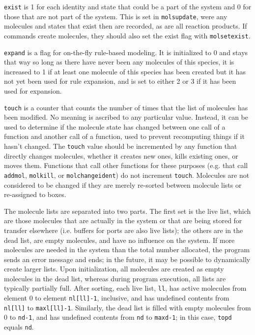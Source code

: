 \documentclass {book}
\begin{document}
\texttt{exist} is 1 for each identity and state that could be a part of the system and 0 for those that are not part of the system.  This is set in \texttt{molsupdate}, were any molecules and states that exist then are recorded, as are all reaction products.  If commands create molecules, they should also set the exist flag with \texttt{molsetexist}.

\texttt{expand} is a flag for on-the-fly rule-based modeling.  It is initialized to 0 and stays that way so long as there have never been any molecules of this species, it is increased to 1 if at least one molecule of this species has been created but it has not yet been used for rule expansion, and is set to either 2 or 3 if it has been used for expansion.

\texttt{touch} is a counter that counts the number of times that the list of molecules has been modified. No meaning is ascribed to any particular value. Instead, it can be used to determine if the molecule state has changed between one call of a function and another call of a function, used to prevent recomputing things if it hasn't changed. The \texttt{touch} value should be incremented by any function that directly changes molecules, whether it creates new ones, kills existing ones, or moves them. Functions that call other functions for these purposes (e.g. that call \texttt{addmol}, \texttt{molkill}, or \texttt{molchangeident}) do not increment \texttt{touch}. Molecules are not considered to be changed if they are merely re-sorted between molecule lists or re-assigned to boxes.

The molecule lists are separated into two parts.  The first set is the live list, which are those molecules that are actually in the system or that are being stored for transfer elsewhere (i.e. buffers for ports are also live lists); the others are in the dead list, are empty molecules, and have no influence on the system.  If more molecules are needed in the system than the total number allocated, the program sends an error message and ends; in the future, it may be possible to dynamically create larger lists.  Upon initialization, all molecules are created as empty molecules in the dead list, whereas during program execution, all lists are typically partially full.  After sorting, each live list, \texttt{ll}, has active molecules from element 0 to element \texttt{nl[ll]-1}, inclusive, and has undefined contents from \texttt{nl[ll]} to \texttt{maxl[ll]-1}.  Similarly, the dead list is filled with empty molecules from 0 to \texttt{nd-1}, and has undefined contents from \texttt{nd} to \texttt{maxd-1}; in this case, \texttt{topd} equals \texttt{nd}.
\end{document}
